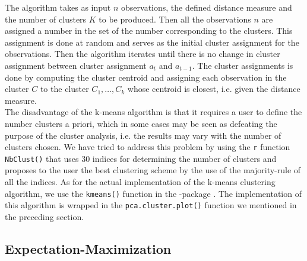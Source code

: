 \documentclass[../thesis.tex]{subfiles}
\begin{document}
\newpage
\noindent The algorithm takes as input $n$ observations, the defined distance measure and the number of clusters $K$ to be produced. Then all the observations $n$ are assigned a number in the set of the number corresponding to the clusters. This assignment is done at random and serves as the initial cluster assignment for the observations. Then the algorithm iterates until there is no change in cluster assignment between cluster assignment $a_t$ and $a_{t-1}$. The cluster assignments is done by computing the cluster centroid and assigning each observation in the cluster $C$ to the cluster $C_1, \hdots, C_k$ whose centroid is closest, i.e. given the distance measure. \\
\indent The disadvantage of the k-means algorithm is that it requires a user to define the number clusters a priori, which in some cases may be seen as defeating the purpose of the cluster analysis, i.e. the results may vary with the number of clusters chosen. We have tried to address this problem by using the \texttt{r} function \texttt{NbClust()} \citep{nbclust} that uses 30 indices for determining the number of clusters and proposes to the user the best clustering scheme by the use of the majority-rule of all the indices. As for the actual implementation of the k-means clustering algorithm, we use the \texttt{kmeans()} function in the -package \citep{stats}. The implementation of this algorithm is wrapped in the \texttt{pca.cluster.plot()} function we mentioned in the preceding section.

\vspace*{-0,25cm}\subsection{Expectation-Maximization}
\label{subsec:em}
\end{document}
